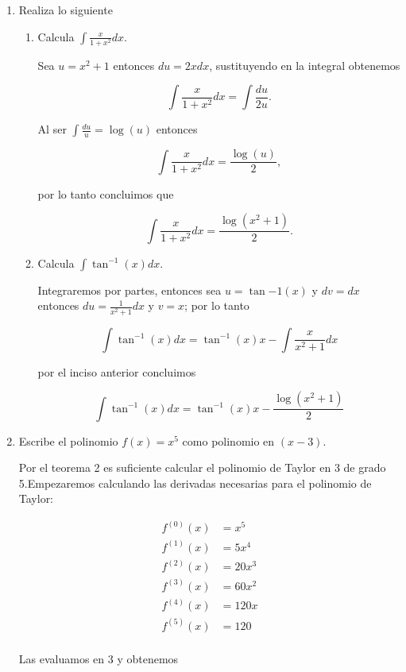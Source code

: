 \documentclass[letterpaper]{article}
\theoremstyle{definition}
\theoremstyle{lemathm}
\theoremstyle{lemademthm}
\begin{document}
	\begin{enumerate}
		
		\item Realiza lo siguiente
		
		\begin{enumerate}
			\item Calcula $\int \frac{x}{1+x^2}dx$.

			Sea $u = x^2 + 1$ entonces $du = 2xdx$, sustituyendo en la integral obtenemos

			\[\int \frac{x}{1+x^2}dx = \int \frac{du}{2u}.\]

			Al ser $\int \frac{du}{u} = \log(u)$ entonces

			\[\int \frac{x}{1+x^2}dx = \frac{\log(u)}{2},\]

			por lo tanto concluimos que

			\[\int \frac{x}{1+x^2}dx = \frac{\log(x^2+1)}{2}.\]

			\item Calcula $\int \tan^{-1}(x)dx$.
			
			Integraremos por partes, entonces sea $u = \tan{-1}(x)$ y $dv = dx$ entonces $du = \frac{1}{x^2+1}dx$ y $v = x$; por lo tanto

			\[\int \tan^{-1}(x)dx = \tan^{-1}(x)x - \int \frac{x}{x^2+1} dx\]

			por el inciso anterior concluimos

			\[\int \tan^{-1}(x)dx = \tan^{-1}(x)x - \frac{\log(x^2+1)}{2}\]

		\end{enumerate}

		\item Escribe el polinomio $f(x) = x^5$ como polinomio en $(x-3)$.
		
		Por el teorema 2 es suficiente calcular el polinomio de Taylor en 3 de grado 5.Empezaremos calculando las derivadas necesarias para el polinomio de Taylor:

		\begin{align*}
			f^{(0)}(x) &= x^5\\
			f^{(1)}(x) &= 5x^4\\
			f^{(2)}(x) &= 20x^3\\
			f^{(3)}(x) &= 60x^2\\
			f^{(4)}(x) &= 120x\\
			f^{(5)}(x) &= 120\\
		\end{align*}

		Las evaluamos en $3$ y obtenemos
		

\end{enumerate}
\end{document}
